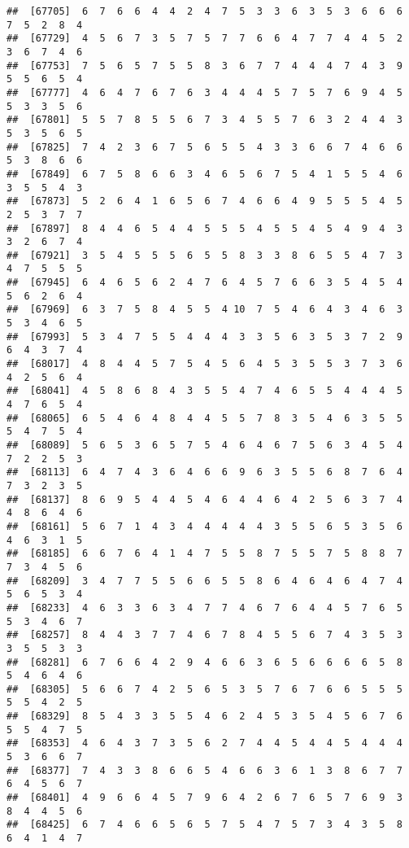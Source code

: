 \documentclass[
]{book}
\begin{document}
\begin{verbatim}
##  [67705]  6  7  6  6  4  4  2  4  7  5  3  3  6  3  5  3  6  6  6  7  5  2  8  4
##  [67729]  4  5  6  7  3  5  7  5  7  7  6  6  4  7  7  4  4  5  2  3  6  7  4  6
##  [67753]  7  5  6  5  7  5  5  8  3  6  7  7  4  4  4  7  4  3  9  5  5  6  5  4
##  [67777]  4  6  4  7  6  7  6  3  4  4  4  5  7  5  7  6  9  4  5  5  3  3  5  6
##  [67801]  5  5  7  8  5  5  6  7  3  4  5  5  7  6  3  2  4  4  3  5  3  5  6  5
##  [67825]  7  4  2  3  6  7  5  6  5  5  4  3  3  6  6  7  4  6  6  5  3  8  6  6
##  [67849]  6  7  5  8  6  6  3  4  6  5  6  7  5  4  1  5  5  4  6  3  5  5  4  3
##  [67873]  5  2  6  4  1  6  5  6  7  4  6  6  4  9  5  5  5  4  5  2  5  3  7  7
##  [67897]  8  4  4  6  5  4  4  5  5  5  4  5  5  4  5  4  9  4  3  3  2  6  7  4
##  [67921]  3  5  4  5  5  5  6  5  5  8  3  3  8  6  5  5  4  7  3  4  7  5  5  5
##  [67945]  6  4  6  5  6  2  4  7  6  4  5  7  6  6  3  5  4  5  4  5  6  2  6  4
##  [67969]  6  3  7  5  8  4  5  5  4 10  7  5  4  6  4  3  4  6  3  5  3  4  6  5
##  [67993]  5  3  4  7  5  5  4  4  4  3  3  5  6  3  5  3  7  2  9  6  4  3  7  4
##  [68017]  4  8  4  4  5  7  5  4  5  6  4  5  3  5  5  3  7  3  6  4  2  5  6  4
##  [68041]  4  5  8  6  8  4  3  5  5  4  7  4  6  5  5  4  4  4  5  4  7  6  5  4
##  [68065]  6  5  4  6  4  8  4  4  5  5  7  8  3  5  4  6  3  5  5  5  4  7  5  4
##  [68089]  5  6  5  3  6  5  7  5  4  6  4  6  7  5  6  3  4  5  4  7  2  2  5  3
##  [68113]  6  4  7  4  3  6  4  6  6  9  6  3  5  5  6  8  7  6  4  7  3  2  3  5
##  [68137]  8  6  9  5  4  4  5  4  6  4  4  6  4  2  5  6  3  7  4  4  8  6  4  6
##  [68161]  5  6  7  1  4  3  4  4  4  4  4  3  5  5  6  5  3  5  6  4  6  3  1  5
##  [68185]  6  6  7  6  4  1  4  7  5  5  8  7  5  5  7  5  8  8  7  7  3  4  5  6
##  [68209]  3  4  7  7  5  5  6  6  5  5  8  6  4  6  4  6  4  7  4  5  6  5  3  4
##  [68233]  4  6  3  3  6  3  4  7  7  4  6  7  6  4  4  5  7  6  5  5  3  4  6  7
##  [68257]  8  4  4  3  7  7  4  6  7  8  4  5  5  6  7  4  3  5  3  3  5  5  3  3
##  [68281]  6  7  6  6  4  2  9  4  6  6  3  6  5  6  6  6  6  5  8  5  4  6  4  6
##  [68305]  5  6  6  7  4  2  5  6  5  3  5  7  6  7  6  6  5  5  5  5  5  4  2  5
##  [68329]  8  5  4  3  3  5  5  4  6  2  4  5  3  5  4  5  6  7  6  5  5  4  7  5
##  [68353]  4  6  4  3  7  3  5  6  2  7  4  4  5  4  4  5  4  4  4  5  3  6  6  7
##  [68377]  7  4  3  3  8  6  6  5  4  6  6  3  6  1  3  8  6  7  7  6  4  5  6  7
##  [68401]  4  9  6  6  4  5  7  9  6  4  2  6  7  6  5  7  6  9  3  8  4  4  5  6
##  [68425]  6  7  4  6  6  5  6  5  7  5  4  7  5  7  3  4  3  5  8  6  4  1  4  7

\end{verbatim}
\end{document}
